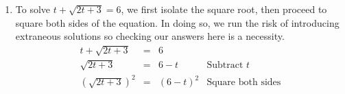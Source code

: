 \documentclass[10pt]{article}
\begin{document}
\begin{ex}
\begin{enumerate}













\item  To solve  $t + \sqrt{2t+3} = 6$, we first isolate the square root, then proceed to square both sides of the equation.  In doing so, we run the risk of introducing extraneous solutions so checking our answers here is a necessity. \[ \begin{array}{rclr}

t + \sqrt{2t+3}  & = & 6 & \\ [2pt]

\sqrt{2t+3} & = & 6 - t & \text{Subtract $t$} \\ [2pt]

(\sqrt{2t+3})^2 & = & (6-t)^2 & \text{Square both sides} \\ [2pt]


\end{array}\]
\end{enumerate}
\end{ex}
\end{document}
